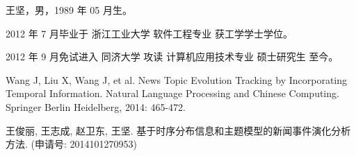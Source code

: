 \begin{resume}

  王坚，男，1989 年 05 月生。
  
  2012 年 7 月毕业于 浙江工业大学 软件工程专业 获工学学士学位。
  
  2012 年 9 月免试进入 同济大学 攻读 计算机应用技术专业 硕士研究生 至今。

  \begin{list}{\@biblabel{\@arabic\c@enumiv}}%
  {
    \renewcommand{\makelabel}[1]{{[}1{]}\hfill}
    \setlength{\itemindent}{0pt}
    \setlength{\labelsep}{-0.2em}
    \setlength{\topsep}{0pt} %
    \setlength{\leftmargin}{\labelwidth+\labelsep}
  }%
    \item Wang J, Liu X, Wang J, et al. News Topic Evolution Tracking
    by Incorporating Temporal Information. Natural Language Processing
    and Chinese Computing. Springer Berlin Heidelberg, 2014: 465-472.
  \end{list}

  \begin{list}{\@biblabel{\@arabic\c@enumiv}}%
  {
    \renewcommand{\makelabel}[1]{{[}1{]}\hfill}
    \setlength{\itemindent}{0pt}
    \setlength{\labelsep}{-0.2em}
    \setlength{\topsep}{0pt} %
    \setlength{\leftmargin}{\labelwidth+\labelsep}
  }%
    \item 王俊丽, 王志成, 赵卫东, 王坚. 基于时序分布信息和主题模型的新闻事件演化分析
    方法. (申请号: 2014101270953)
  \end{list}

\end{resume}
